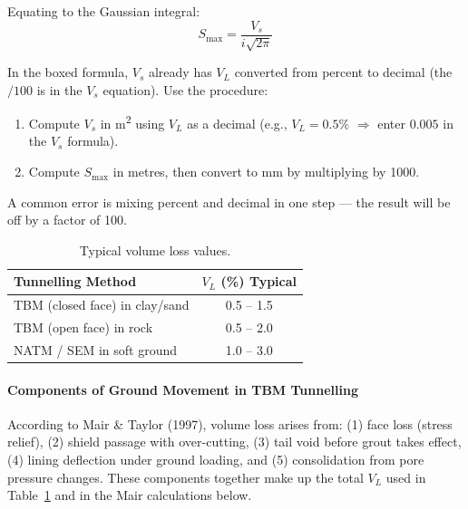 Equating to the Gaussian integral:
\[
\boxed{S_{\text{max}} = \frac{V_s}{i \sqrt{2\pi}}}
\]

\begin{warnbox}
In the boxed formula, $V_s$ already has $V_L$ converted from percent to decimal (the $/100$ is in the $V_s$ equation). Use the procedure:
\begin{enumerate}[nosep]
 \item Compute $V_s$ in m\textsuperscript{2} using $V_L$ as a decimal (e.g., $V_L = 0.5\%$ $\Rightarrow$ enter $0.005$ in the $V_s$ formula).
 \item Compute $S_{\text{max}}$ in metres, then convert to mm by multiplying by 1000.
\end{enumerate}
\vspace{0.5em}

A common error is mixing percent and decimal in one step --- the result will be off by a factor of 100.
\end{warnbox}

\begin{table}[h!]
\centering
\begin{tabular}{lc}
\toprule
\textbf{Tunnelling Method} & \textbf{$V_L$ (\%) Typical} \\
\midrule
TBM (closed face) in clay/sand & 0.5 -- 1.5 \\
TBM (open face) in rock & 0.5 -- 2.0 \\
NATM / SEM in soft ground & 1.0 -- 3.0 \\
\bottomrule
\end{tabular}
\caption{Typical volume loss values.}
\label{tab:vl_values}
\end{table}

\paragraph{Components of Ground Movement in TBM Tunnelling}
According to Mair \& Taylor (1997), volume loss arises from: (1) face loss (stress relief), (2) shield passage with over-cutting, (3) tail void before grout takes effect, (4) lining deflection under ground loading, and (5) consolidation from pore pressure changes. These components together make up the total $V_L$ used in Table~\ref{tab:vl_values} and in the Mair calculations below.

